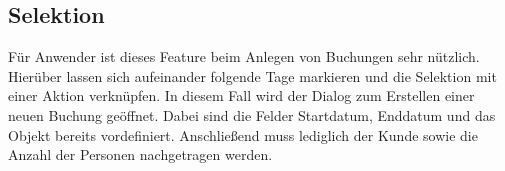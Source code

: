 \subsection{Selektion}
Für Anwender ist dieses Feature beim Anlegen von Buchungen sehr nützlich. Hierüber lassen sich aufeinander folgende Tage markieren und die Selektion mit einer Aktion verknüpfen.
In diesem Fall wird der Dialog zum Erstellen einer neuen Buchung geöffnet.
Dabei sind die Felder Startdatum, Enddatum und das Objekt bereits vordefiniert. Anschließend muss lediglich der Kunde sowie die Anzahl der Personen nachgetragen werden.